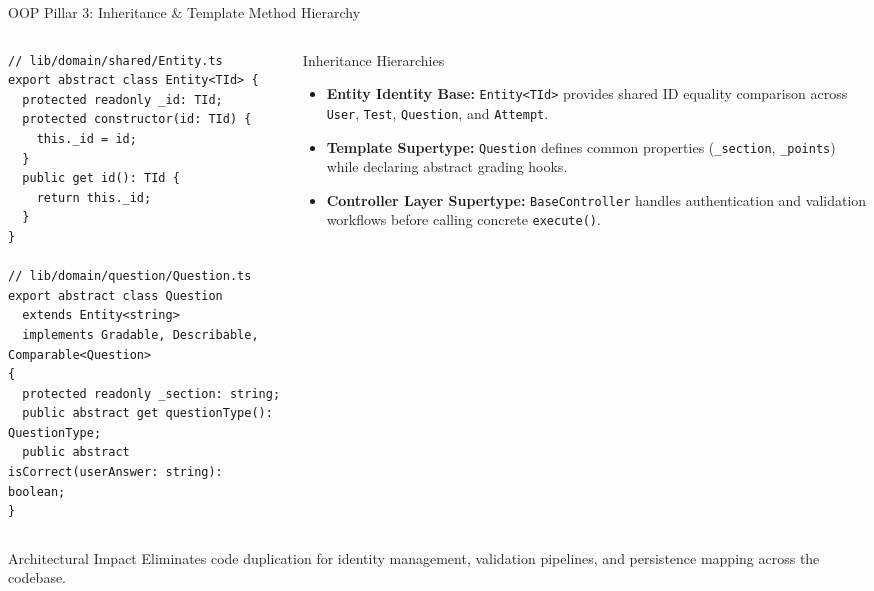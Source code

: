 ﻿\documentclass[aspectratio=169,10pt,t]{beamer}
\begin{document}
\begin{frame}[fragile]{OOP Pillar 3: Inheritance \& Template Method Hierarchy}
  \vspace{-1.0mm}
  \begin{columns}[T,onlytextwidth]
    \begin{column}{0.54\textwidth}
      \begin{codeBox}
\begin{lstlisting}
// lib/domain/shared/Entity.ts
export abstract class Entity<TId> {
  protected readonly _id: TId;
  protected constructor(id: TId) {
    this._id = id;
  }
  public get id(): TId {
    return this._id;
  }
}

// lib/domain/question/Question.ts
export abstract class Question
  extends Entity<string>
  implements Gradable, Describable, Comparable<Question>
{
  protected readonly _section: string;
  public abstract get questionType(): QuestionType;
  public abstract isCorrect(userAnswer: string): boolean;
}
\end{lstlisting}
      \end{codeBox}
    \end{column}

    \begin{column}{0.44\textwidth}
      \begin{infoCard}{Inheritance Hierarchies}
        \begin{itemize}\setlength{\itemsep}{1.2pt}\setlength{\parskip}{0pt}\setlength{\leftmargini}{7pt}
          \item \textbf{Entity Identity Base:} \texttt{Entity<TId>} provides shared ID equality comparison across \texttt{User}, \texttt{Test}, \texttt{Question}, and \texttt{Attempt}.
          \item \textbf{Template Supertype:} \texttt{Question} defines common properties (\texttt{\_section}, \texttt{\_points}) while declaring abstract grading hooks.
          \item \textbf{Controller Layer Supertype:} \texttt{BaseController} handles authentication and validation workflows before calling concrete \texttt{execute()}.
        \end{itemize}
      \end{infoCard}
    \end{column}
  \end{columns}

  \vspace{0.8mm}
  \begin{hlCard}{Architectural Impact}
    Eliminates code duplication for identity management, validation pipelines, and persistence mapping across the codebase.
  \end{hlCard}
\end{frame}
\end{document}
